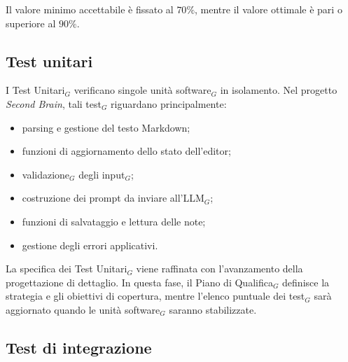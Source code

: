 \documentclass[a4paper, 10pt, colorlinks=true, linkcolor=black, urlcolor=blue, citecolor=blue, hidelinks]{article}
\begin{document}
Il valore minimo accettabile è fissato al $70\%$, mentre il valore ottimale è pari o superiore al $90\%$.

\subsection{Test unitari}

I Test Unitari$_G$ verificano singole unità software$_G$ in isolamento. Nel progetto \textit{Second Brain}, tali test$_G$ riguardano principalmente:
\begin{itemize}
    \item parsing e gestione del testo Markdown;
    \item funzioni di aggiornamento dello stato dell'editor;
    \item validazione$_G$ degli input$_G$;
    \item costruzione dei prompt da inviare all'LLM$_G$;
    \item funzioni di salvataggio e lettura delle note;
    \item gestione degli errori applicativi.
\end{itemize}

La specifica dei Test Unitari$_G$ viene raffinata con l'avanzamento della progettazione di dettaglio. In questa fase, il Piano di Qualifica$_G$ definisce la strategia e gli obiettivi di copertura, mentre l'elenco puntuale dei test$_G$ sarà aggiornato quando le unità software$_G$ saranno stabilizzate.

\subsection{Test di integrazione}

\end{document}
